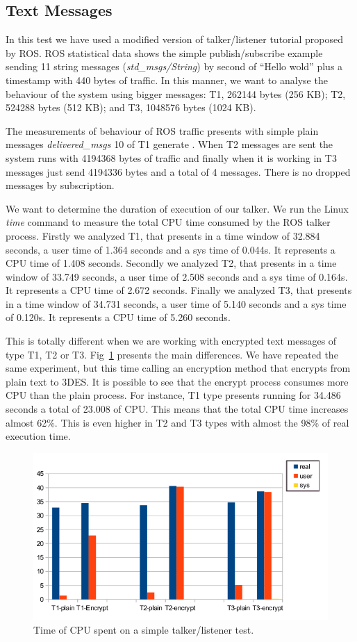 \documentclass[journal,twoside]{JoPhA}
\begin{document}
\subsection{Text Messages}


In this test we have used a modified version of talker/listener tutorial proposed by ROS. 
ROS statistical data shows the simple publish/subscribe example sending 11 string messages ({\em std\_msgs/String}) by second of ``Hello wold'' plus a timestamp with 440 bytes of traffic.
In this manner, we want to analyse the behaviour of the system using bigger messages: T1, 262144 bytes (256 KB); T2, 524288 bytes (512 KB); and T3, 1048576 bytes (1024 KB).

The measurements of behaviour of ROS traffic presents with simple plain messages {\em delivered\_msgs} 10 of T1 generate . When T2 messages are sent the system runs with 4194368 bytes of traffic and finally when it is working in  T3 messages just send 4194336 bytes and a total of 4 messages. There is no dropped messages by subscription.

We want to determine the duration of execution of our talker. We run the Linux {\em time} command to measure the total CPU time consumed by the ROS talker process. 
Firstly we analyzed T1, that presents in a time window of 32.884 seconds, a user time of  1.364 seconds and a sys time of 0.044s. It represents a CPU time of 1.408 seconds.
Secondly we analyzed T2, that presents in a time window of 33.749 seconds, a user time of  2.508 seconds and a sys time of 0.164s. It represents a CPU time of 2.672 seconds.
Finally we analyzed T3, that presents in a time window of 34.731 seconds, a user time of  5.140 seconds and a sys time of 0.120s. It represents a CPU time of 5.260 seconds.

This is totally different when we are working with encrypted text messages of type T1, T2 or T3. Fig~\ref{fig:time_text_CPU} presents the main differences. We have repeated the same experiment, but this time calling an encryption method that encrypts from plain text to 3DES. It is possible to see that the encrypt process consumes more CPU than  the plain process.
For instance, T1 type presents running for 34.486 seconds a total of 23.008 of CPU. This means that the total CPU time increases almost 62\%. This is even higher in T2 and T3 types with almost the 98\% of real execution time.
\begin{figure}[ht!]
    \centering
    \includegraphics[width=.5\textwidth]{Tiempos_CPU_cifrado_texto.png}
    \caption{Time of CPU spent on a simple talker/listener test.}
  \label{fig:time_text_CPU}
\end{figure}
\end{document}
